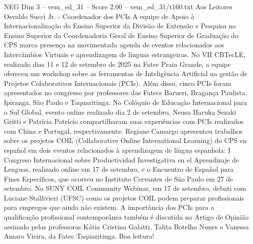 \begin{textsample}{NEG Dim 3 – vem\_ed\_31 – Score 2.00 – vem\_ed\_31/t160.txt}  \label{ex:f3_neg_139}
Aos Leitores Osvaldo Succi Jr. - Coordenador dos PCIs A equipe de Apoio à Internacionalização do Ensino Superior da Divisão de Extensão e Pesquisa no Ensino Superior da Coordenadoria Geral de Ensino Superior de Graduação do CPS marca presença na movimentada agenda de eventos relacionados aos Intercâmbios Virtuais e aprendizagem de línguas estrangeiras.
No VII CBTecLE, realizado dias 11 e 12 de setembro de 2025 na Fatec Praia Grande, a equipe ofereceu um workshop sobre as ferramentas de Inteligência Artificial na gestão de Projetos Colaborativos Internacionais (PCIs).
Além disso, cinco PCIs foram apresentados no congresso por professores das Fatecs Barueri, Bragança Paulista, Ipiranga, São Paulo e Taquaritinga.
No Colóquio de Educação Internacional para o Sul Global, evento online realizado dia 2 de setembro, Neusa Haruka Sezaki Gritti e Patrícia Patrício compartilharam suas experiências com PCIs realizados com China e Portugal, respectivamente.
Regiane Camargo apresentou trabalhos sobre os projetos COIL (Collaborative Online International Learning) do CPS en español em dois eventos relacionados à aprendizagem de língua espanhola: I Congreso Internacional sobre Productividad Investigativa en el Aprendizaje de Lenguas, realizado online em 17 de setembro, e o Encuentro de Español para Fines Específicos, que ocorreu no Instituto Cervantes de São Paulo em 27 de setembro.
No SUNY COIL Community Webinar, em 17 de setembro, debati com Luciane Stallivieri (UFSC) como os projetos COIL podem preparar profissionais para empregos que ainda não existem.
A importância dos PCIs para a qualificação profissional contemporânea também é discutida no Artigo de Opinião assinado pelas professoras Kátia Cristina Galatti, Talita Botelho Nunes e Vanessa Amaro Vieira, da Fatec Taquaritinga.
Boa leitura!

\end{textsample}

